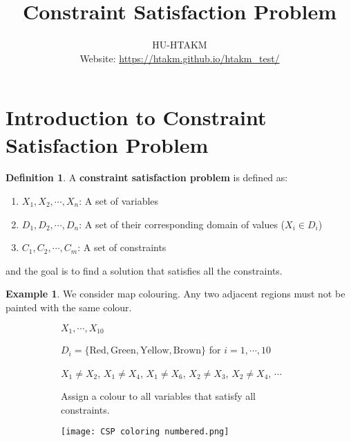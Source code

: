 \documentclass{article}
\title{
	\Huge Constraint Satisfaction Problem
}
\author{
	HU-HTAKM\\
	\small Website: \url{https://htakm.github.io/htakm_test/}
}
\theoremstyle{definition}
\newtheorem{definition}{Definition}[section]
\newtheorem{example}{Example}[definition]
\begin{document}
\maketitle
\section{Introduction to Constraint Satisfaction Problem}
\begin{definition}
	A \textbf{constraint satisfaction problem} is defined as:
	\begin{enumerate}
		\item $X_{1},X_{2},\cdots,X_{n}$: A set of variables
		\item $D_{1},D_{2},\cdots,D_{n}$: A set of their corresponding domain of values ($X_{i}\in D_{i}$)
		\item $C_{1},C_{2},\cdots,C_{m}$: A set of constraints
	\end{enumerate}
	and the goal is to find a solution that satisfies all the constraints.
\end{definition}
\begin{example}
	\label{Map colouring problem}
	We consider map colouring. Any two adjacent regions must not be painted with the same colour.
	\begin{figure}[h]
		\begin{subfigure}[h]{0.64\textwidth}
			\begin{description}[style=nextline]
				\item[Variables:] $X_{1},\cdots,X_{10}$
				\item[Domain:] $D_{i}=\{\text{Red},\text{Green},\text{Yellow},\text{Brown}\}$ for $i=1,\cdots,10$
				\item[Constraint:] $X_{1}\neq X_{2}$, $X_{1}\neq X_{4}$, $X_{1}\neq X_{6}$, $X_{2}\neq X_{3}$, $X_{2}\neq X_{4}$, $\cdots$
				\item[Goal:] Assign a colour to all variables that satisfy all constraints.
			\end{description}
		\end{subfigure}
		\begin{subfigure}[h]{0.35\textwidth}
			\texttt{[image: CSP coloring numbered.png]}
		\end{subfigure}
	\end{figure}
\end{example}
\end{document}
